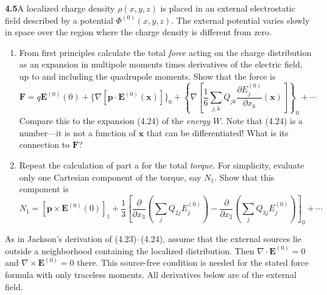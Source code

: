 \par\bigskip
\noindent\textbf{4.5}\quad A localized charge density $\rho(x,y,z)$ is placed in an external electrostatic field described by a potential $\Phi^{(0)}(x,y,z)$. The external potential varies slowly in space over the region where the charge density is different from zero. 
\begin{enumerate}
\item[(a)] From first principles calculate the total \emph{force} acting on the charge distribution as an expansion in multipole moments times derivatives of the electric field, up to and including the quadrupole moments. Show that the force is
\[
\mathbf{F}=q\mathbf{E}^{(0)}(0)+\{\nabla[\mathbf{p}\cdot\mathbf{E}^{(0)}(\mathbf{x})]\}_{0}+\left\{\nabla\!\left[\frac{1}{6}\sum_{j,k}Q_{jk}\frac{\partial E_{j}^{(0)}}{\partial x_{k}}(\mathbf{x})\right]\right\}_{0}+\cdots
\]
Compare this to the expansion (4.24) of the \emph{energy} $W$. Note that (4.24) is a number---it is not a function of $\mathbf{x}$ that can be differentiated! What is its connection to $\mathbf{F}$?
\item[(b)] Repeat the calculation of part a for the total \emph{torque}. For simplicity, evaluate only one Cartesian component of the torque, say $N_{1}$. Show that this component is
\[
N_{1}=[\mathbf{p}\times\mathbf{E}^{(0)}(0)]_{1}+\frac{1}{3}\left[\frac{\partial}{\partial x_{3}}\left(\sum_{j}Q_{2j}E_{j}^{(0)}\right)-\frac{\partial}{\partial x_{2}}\left(\sum_{j}Q_{3j}E_{j}^{(0)}\right)\right]_{0}+\cdots
\]
\end{enumerate}
\solution

As in Jackson's derivation of (4.23)--(4.24), assume that the external
sources lie outside a neighborhood containing the localized distribution.
Then $\nabla\cdot\mathbf E^{(0)}=0$ and
$\nabla\times\mathbf E^{(0)}=0$ there. This source-free condition is
needed for the stated force formula with only traceless moments.
All derivatives below are of the external field.

